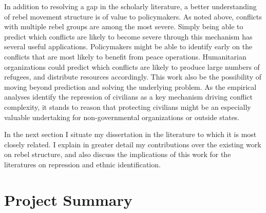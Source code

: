 \documentclass[12pt,]{book}
\theoremstyle{definition}
\theoremstyle{definition}
\theoremstyle{definition}
\theoremstyle{remark}
\begin{document}
In addition to resolving a gap in the scholarly literature, a better
understanding of rebel movement structure is of value to policymakers.
As noted above, conflicts with multiple rebel groups are among the most
severe. Simply being able to predict which conflicts are likely to
become severe through this mechanism has several useful applications.
Policymakers might be able to identify early on the conflicts that are
most likely to benefit from peace operations. Humanitarian organizations
could predict which conflicts are likely to produce large numbers of
refugees, and distribute resources accordingly. This work also be the
possibility of moving beyond prediction and solving the underlying
problem. As the empirical analyses identify the repression of civilians
as a key mechanism driving conflict complexity, it stands to reason that
protecting civilians might be an especially valuable undertaking for
non-governmental organizations or outside states.

In the next section I situate my dissertation in the literature to which
it is most closely related. I explain in greater detail my contributions
over the existing work on rebel structure, and also discuss the
implications of this work for the literatures on repression and ethnic
identification.

\hypertarget{project-summary}{%
\section{Project Summary}\label{project-summary}}
\end{document}
